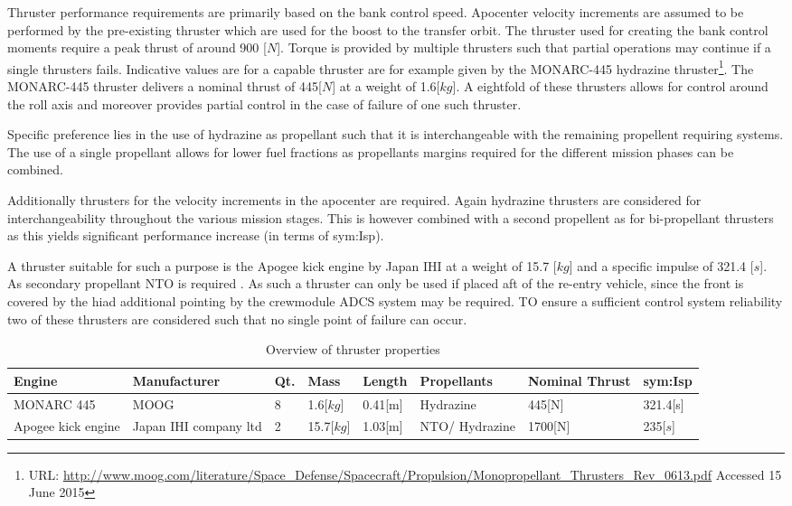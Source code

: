 Thruster performance requirements are primarily based on the bank control speed. Apocenter velocity increments are assumed to be performed by the pre-existing thruster which are used for the boost to the transfer orbit. The thruster used for creating the bank control moments require a peak thrust of around 900 [$N$]. Torque is provided by multiple thrusters such that partial operations may continue if a single thrusters fails.
 Indicative values are for a capable thruster are for example given by the  MONARC-445 hydrazine thruster\footnote{URL: \url{http://www.moog.com/literature/Space\_Defense/Spacecraft/Propulsion/Monopropellant\_Thrusters\_Rev\_0613.pdf} Accessed 15 June 2015}. The MONARC-445 thruster delivers a nominal thrust of 445[$N$] at a weight of 1.6[$kg$].  A eightfold of these thrusters allows for control around the roll axis and moreover provides partial control in the case of failure of one such thruster.
 
Specific preference lies in the use of hydrazine as propellant such that it is interchangeable with the remaining propellent requiring systems. The use of a single propellant allows for lower fuel fractions as propellants margins required for the different mission phases can be combined.

Additionally thrusters for the velocity increments in the apocenter are required. Again hydrazine thrusters are considered for interchangeability throughout the various mission stages. This is however combined with a second propellent as for bi-propellant thrusters as this yields significant performance increase (in terms of \gls{sym:Isp})\cite{Wertz2011}. 

A thruster suitable for such a purpose is the Apogee kick engine by Japan IHI at a weight of 15.7 [$kg$] and a specific impulse of 321.4 [$s$]. As secondary propellant NTO is required \cite[p.538]{Wertz2011}. As such a thruster can only be used if placed aft of the re-entry vehicle, since the front is covered by the \gls{hiad} additional pointing by the crewmodule ADCS system may be required. TO ensure a sufficient control system reliability two of these thrusters are considered such that no single point of failure can occur. 

\begin{table}[h]
\centering
\caption{Overview of thruster properties}
\label{tab:thrusters}
\begin{tabular}{|p{}|p{}|l|l|l|p{}|p{}|l|} \hline \hline
Engine              & Manufacturer          & Qt. & Mass       & Length  & Propellants   & Nominal Thrust & \gls{sym:Isp} \\ \hline
MONARC 445          & MOOG                  & 8        & 1.6[$kg$]  & 0.41[m] & Hydrazine     & 445[N]         & 321.4[s]      \\ \hline
Apogee kick engine & Japan IHI company ltd & 2        & 15.7[$kg$] & 1.03[m] & NTO/ Hydrazine & 1700[N]        & 235[$s$]     \\ \hline
\end{tabular}
\end{table}


